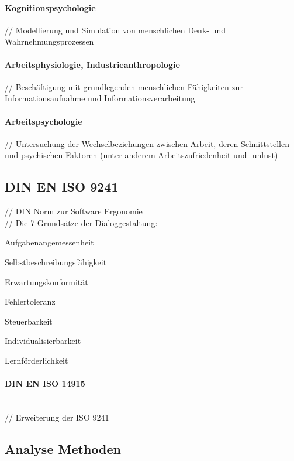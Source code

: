 \documentclass[12pt,a4paper,bibliography=totocnumbered,listof=totocnumbered]{scrartcl}
\begin{document}
\paragraph{Kognitionspsychologie}
// Modellierung und Simulation von menschlichen Denk- und Wahrnehmungsprozessen\\

\paragraph{Arbeitsphysiologie, Industrieanthropologie}
// Beschäftigung mit grundlegenden menschlichen Fähigkeiten zur Informationsaufnahme und Informationsverarbeitung\\

\paragraph{Arbeitspsychologie}
// Untersuchung der Wechselbeziehungen zwischen Arbeit, deren Schnittstellen und psychischen Faktoren (unter anderem Arbeitszufriedenheit und -unlust)\\

\subsection{DIN EN ISO 9241}
// DIN Norm zur Software Ergonomie\\
// Die 7 Grundsätze der Dialoggestaltung:
\begin{compactitem}
	\item Aufgabenangemessenheit
	\item Selbstbeschreibungsfähigkeit
	\item Erwartungskonformität
	\item Fehlertoleranz
	\item Steuerbarkeit
	\item Individualisierbarkeit
	\item Lernförderlichkeit
\end{compactitem}
\paragraph{DIN EN ISO 14915}
$\;$ \\
// Erweiterung der ISO 9241\\

\subsection{Analyse Methoden}
\end{document}

